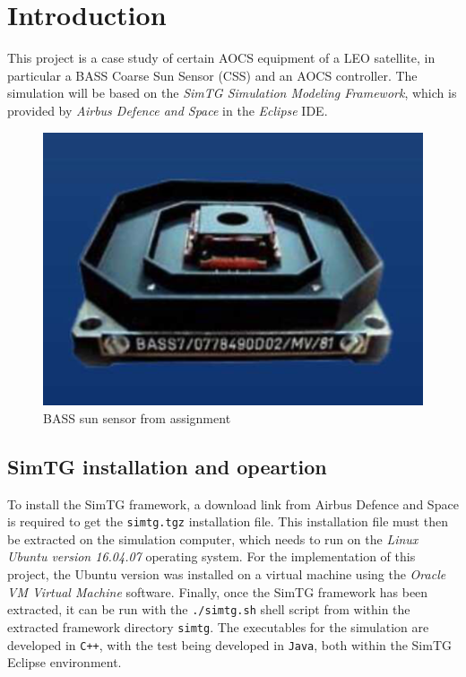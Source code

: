 \section{Introduction}
\label{sec:introduction}

This project is a case study of certain AOCS equipment of a LEO satellite, in particular a BASS Coarse Sun Sensor (CSS) and an AOCS controller.
The simulation will be based on the \textit{SimTG Simulation Modeling Framework}, which is provided by \textit{Airbus Defence and Space} in the \textit{Eclipse} IDE. 

\begin{figure}[h]
    \centering
    \includegraphics[width=0.5\linewidth]{Graphics/BASS.png}
    \caption{BASS sun sensor from assignment}
    \label{fig:bass}
\end{figure}

\subsection{SimTG installation and opeartion}
To install the SimTG framework, a download link from Airbus Defence and Space is required to get the \texttt{simtg.tgz} installation file.
This installation file must then be extracted on the simulation computer, which needs to run on the \textit{Linux Ubuntu version 16.04.07} operating system. 
For the implementation of this project, the Ubuntu version was installed on a virtual machine using the \textit{Oracle VM Virtual Machine} software. 
Finally, once the SimTG framework has been extracted, it can be run with the \texttt{./simtg.sh} shell script from within the extracted framework directory \texttt{simtg}.
The executables for the simulation are developed in \texttt{C++}, with the test being developed in \texttt{Java}, both within the SimTG Eclipse environment.












